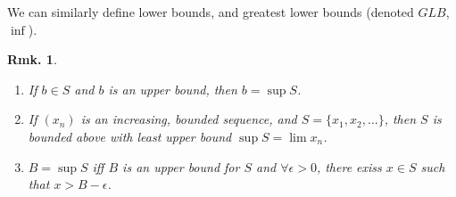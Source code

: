 \documentclass[12pt, a4paper]{book}
\newtheorem{remark}[theorem]{Rmk.}
\theoremstyle{nonumberplain}
\begin{document}
We can similarly define lower bounds, and greatest lower bounds (denoted $GLB$, $\inf$).
\begin{remark}\hspace{1cm}
    \begin{enumerate}
        \item If $b\in S$ and $b$ is an upper bound, then $b=\sup S$.
        \item If $(x_n)$ is an increasing, bounded sequence, and $S=\{x_1,x_2,\ldots\}$, then $S$ is bounded above with
            least upper bound $\sup S=\lim x_n$.
            \begin{center}
            \end{center}
        \item $B=\sup S$ iff $B$ is an upper bound for $S$ and $\forall\epsilon>0$, there exiss $x\in S$ such that $x>B-\epsilon$.
    \end{enumerate}
\end{remark}
\end{document}
